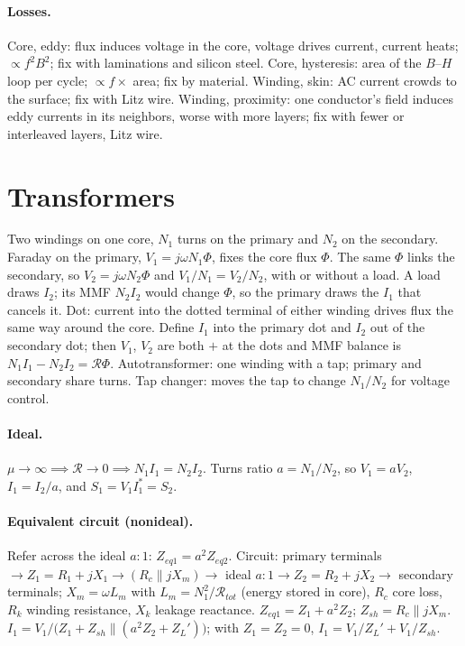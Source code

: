 \documentclass{article}
\newcommand{\abs}[1]{\lvert#1\rvert}
\begin{document}
\paragraph{Losses.}
Core, eddy: flux induces voltage in the core, voltage drives current, current heats; $\propto f^2B^2$; fix with laminations and silicon steel.
Core, hysteresis: area of the $B$--$H$ loop per cycle; $\propto f\times$ area; fix by material.
Winding, skin: AC current crowds to the surface; fix with Litz wire.
Winding, proximity: one conductor's field induces eddy currents in its neighbors, worse with more layers; fix with fewer or interleaved layers, Litz wire.



\section{Transformers}
Two windings on one core, $N_1$ turns on the primary and $N_2$ on the secondary.
Faraday on the primary, $V_1 = j\omega N_1 \Phi$, fixes the core flux $\Phi$.
The same $\Phi$ links the secondary, so $V_2 = j\omega N_2 \Phi$ and $V_1/N_1 = V_2/N_2$, with or without a load.
A load draws $I_2$; its MMF $N_2 I_2$ would change $\Phi$, so the primary draws the $I_1$ that cancels it.
Dot: current into the dotted terminal of either winding drives flux the same way around the core.
Define $I_1$ into the primary dot and $I_2$ out of the secondary dot; then $V_1$, $V_2$ are both $+$ at the dots and MMF balance is $N_1 I_1 - N_2 I_2 = \mathcal R\Phi$.
Autotransformer: one winding with a tap; primary and secondary share turns.
Tap changer: moves the tap to change $N_1/N_2$ for voltage control.

\paragraph{Ideal.}
$\mu\to\infty \implies \mathcal R\to 0 \implies N_1 I_1 = N_2 I_2$.
Turns ratio $a = N_1/N_2$, so $V_1 = aV_2$, $I_1 = I_2/a$, and $S_1 = V_1 I_1^* = S_2$.

\paragraph{Equivalent circuit (nonideal).}
Refer across the ideal $a{:}1$: $Z_{eq1} = a^2 Z_{eq2}$.
Circuit: primary terminals $\to Z_1 = R_1 + jX_1 \to (R_c \parallel jX_m) \to$ ideal $a{:}1 \to Z_2 = R_2 + jX_2 \to$ secondary terminals; $X_m = \omega L_m$ with $L_m = N_1^2/\mathcal R_{tot}$ (energy stored in core), $R_c$ core loss, $R_k$ winding resistance, $X_k$ leakage reactance.
$Z_{eq1} = Z_1 + a^2 Z_2$; $Z_{sh} = R_c \parallel jX_m$.
$I_1 = V_1/\big(Z_1 + Z_{sh}\parallel(a^2 Z_2 + Z_L')\big)$; with $Z_1 = Z_2 = 0$, $I_1 = V_1/Z_L' + V_1/Z_{sh}$.
\end{document}
